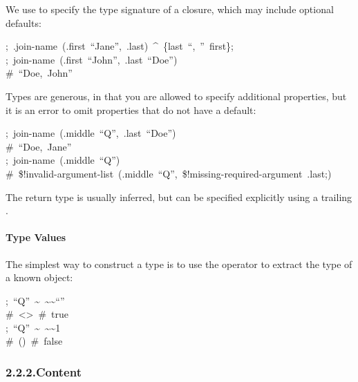 \documentclass[preprint]{{acmart}}
\begin{document}
\noindent{}We use \mdcode{\textasciicircum{}} to specify the type signature of a closure, which may include
optional defaults:%
\begin{mdpre}%
\noindent;~.join-name~(.first~“{Jane}”,~.last)~\textasciicircum{}~\{last~“,~”~first\};\\
;~join-name~(.first~“{John}”,~.last~“{Doe}”)\\
{\#~“Doe,~John”}%
\end{mdpre}\noindent{}Types are generous, in that you are allowed to specify additional properties,
but it is an error to omit properties that do not have a default:
\begin{mdpre}%
\noindent;~join-name~(.middle~“{Q}”,~.last~“{Doe}”)\\
{\#~“Doe,~Jane”}\\
;~join-name~(.middle~“{Q}”)\\
{\#~\$!invalid-argument-list~(.middle~“Q”,~\$!missing-required-argument~.last;)}%
\end{mdpre}\noindent{}The return type is usually inferred, but can be specified explicitly using a trailing \mdcode{\textasciicircum{}\textasciicircum{}}.

\paragraph{Type Values}\label{sec-type-values}%

\noindent{}The simplest way to construct a type is to use the \mdcode{\textasciitilde{}\textasciitilde{}} operator to extract the type
of a known object:%
\begin{mdpre}%
\noindent;~“{Q}”~\textasciitilde{}~\textasciitilde{}\textasciitilde{}“”\\
{\#~\textless{}\textgreater{}~\#~true}\\
;~“{Q}”~\textasciitilde{}~\textasciitilde{}\textasciitilde{}1\\
{\#~()~\#~false}%
\end{mdpre}
\subsubsection{2.2.2.\hspace*{0.5em}Content}\label{sec-content}%
\end{document}
